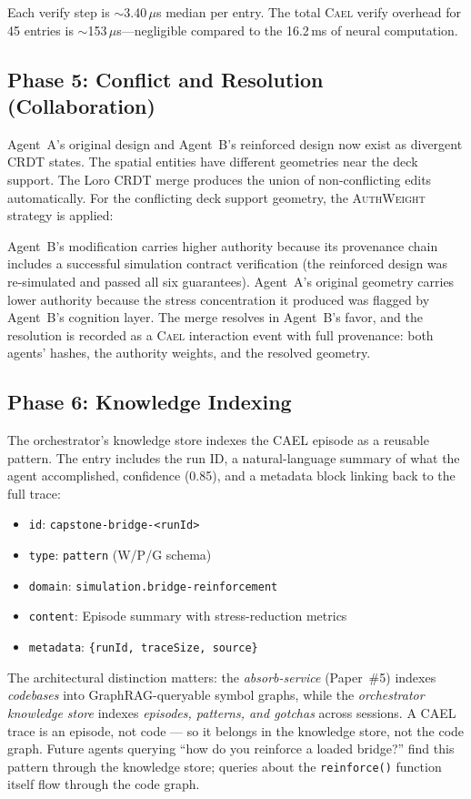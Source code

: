 \documentclass[sigchi-a]{acmart}
\newcommand{\cael}{\textsc{Cael}}
\begin{document}
Each verify step is $\sim$3.40\,$\mu$s median per entry. The total \cael{} verify
overhead for 45 entries is $\sim$153\,$\mu$s---negligible compared to the 16.2\,ms of
neural computation.

\subsection{Phase 5: Conflict and Resolution (Collaboration)}

Agent~A's original design and Agent~B's reinforced design now exist as
divergent CRDT states. The spatial entities have different geometries near
the deck support. The Loro CRDT merge produces the union of non-conflicting
edits automatically. For the conflicting deck support geometry, the
\textsc{AuthWeight} strategy is applied:

Agent~B's modification carries higher authority because its provenance chain
includes a successful simulation contract verification (the reinforced
design was re-simulated and passed all six guarantees). Agent~A's original
geometry carries lower authority because the stress concentration it produced
was flagged by Agent~B's cognition layer. The merge resolves in Agent~B's
favor, and the resolution is recorded as a \cael{} interaction event with
full provenance: both agents' hashes, the authority weights, and the
resolved geometry.

\subsection{Phase 6: Knowledge Indexing}

The orchestrator's knowledge store indexes the CAEL episode as a reusable
pattern. The entry includes the run ID, a natural-language summary of what
the agent accomplished, confidence (0.85), and a metadata block linking back
to the full trace:
\begin{itemize}
  \item \texttt{id}: \texttt{capstone-bridge-<runId>}
  \item \texttt{type}: \texttt{pattern} (W/P/G schema)
  \item \texttt{domain}: \texttt{simulation.bridge-reinforcement}
  \item \texttt{content}: Episode summary with stress-reduction metrics
  \item \texttt{metadata}: \texttt{\{runId, traceSize, source\}}
\end{itemize}

The architectural distinction matters: the \emph{absorb-service} (Paper~\#5)
indexes \emph{codebases} into GraphRAG-queryable symbol graphs, while the
\emph{orchestrator knowledge store} indexes \emph{episodes, patterns, and
gotchas} across sessions. A CAEL trace is an episode, not code --- so it
belongs in the knowledge store, not the code graph. Future agents querying
``how do you reinforce a loaded bridge?'' find this pattern through the
knowledge store; queries about the \texttt{reinforce()} function itself flow
through the code graph.
\end{document}
